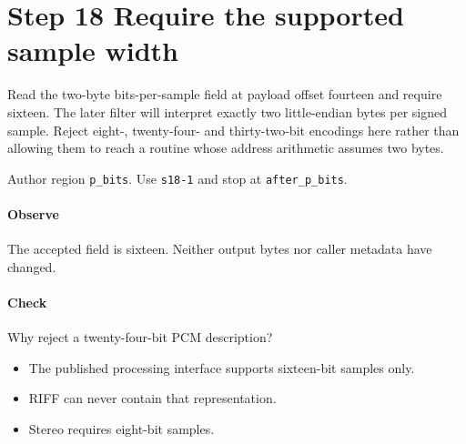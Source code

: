 \section{Step 18 Require the supported sample width}\label{pcm-wav-s18}
Read the two-byte bits-per-sample field at payload offset fourteen and require sixteen. The later filter will interpret exactly two little-endian bytes per signed sample. Reject eight-, twenty-four- and thirty-two-bit encodings here rather than allowing them to reach a routine whose address arithmetic assumes two bytes.

Author region \texttt{p\_bits}. Use \texttt{s18-1} and stop at \texttt{after\_p\_bits}.

\paragraph{Observe} The accepted field is sixteen. Neither output bytes nor caller metadata have changed.

\paragraph{Check} Why reject a twenty-four-bit PCM description?
\begin{itemize}
\item[A.] The published processing interface supports sixteen-bit samples only.
\item[B.] RIFF can never contain that representation.
\item[C.] Stereo requires eight-bit samples.
\end{itemize}
